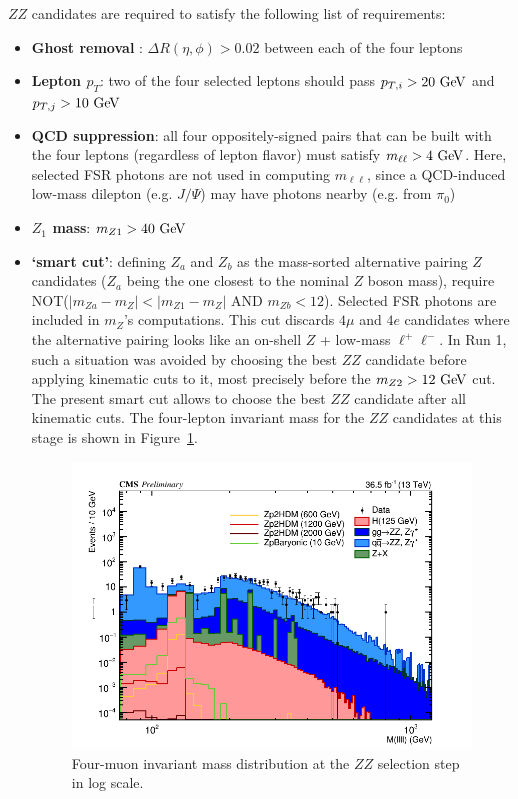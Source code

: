 \begin{enumerate}
$ZZ$ candidates are required to satisfy the following list of requirements:
  \begin{itemize} 
  \item {\bf Ghost removal }: $\Delta R(\eta,\phi) > 0.02$ between each of the four leptons
  \item {\bf Lepton $p_T$}: two of the four selected leptons should pass 
     $p_{T,i} > 20~\mathrm{Ge\kern -0.1em V}$ and $p_{T,j} > 10~\mathrm{Ge\kern -0.1em V}$
  \item {\bf QCD suppression}: all four oppositely-signed pairs that can
     be built with the four leptons (regardless of lepton flavor)
     must satisfy $m_{\ell\ell} > 4~\mathrm{Ge\kern -0.1em V}$.
     Here, selected FSR photons are not used in computing $m_{\ell\ell}$, 
     since a QCD-induced low-mass dilepton (e.g. $J/\Psi$) 
     may have photons nearby (e.g. from $\pi_0$)
  \item {\bf $Z_1$ mass}: $m_{Z1} > 40~\mathrm{Ge\kern -0.1em V}$
  \item {\bf `smart cut'}: defining $Z_a$ and $Z_b$ as 
     the mass-sorted alternative pairing $Z$ candidates 
     ($Z_a$ being the one closest to the nominal $Z$ boson mass),
     require NOT($|m_{ Za}-m_{ Z}| < |m_{ Z1}-m_{ Z}|$ AND $m_{ Zb}<12$).
     Selected FSR photons are included in $m_{ Z}$'s computations.
     This cut discards $4\mu$ and $4e$ candidates where the alternative pairing
     looks like an on-shell $Z$ + low-mass $\ell^+ \ell^-$. 
     In Run 1, such a situation was avoided by choosing the best $ZZ$ candidate
     before applying kinematic cuts to it, most precisely before the $m_{Z2} > 12~\mathrm{Ge\kern -0.1em V}$ cut.
     The present smart cut allows to choose the best $ZZ$ candidate after all kinematic cuts.
The four-lepton invariant mass for the $ZZ$ candidates at this stage is shown in Figure~\ref{fig:m4mu5}.   
\begin{figure}[tbh]
\centering
\includegraphics[width=5.5in]{figures/hist_hM4l_5_log.png}
    \caption{Four-muon invariant mass distribution at the $ZZ$ selection step in log scale.}
    \label{fig:m4mu5}
\end{figure}


\end{itemize}
\end{enumerate}
